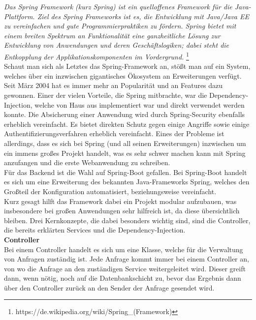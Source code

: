 \emph{\glqq   
Das Spring Framework (kurz Spring) ist ein quelloffenes Framework für die Java-Plattform. Ziel des Spring Frameworks ist es, die Entwicklung mit Java/Java EE zu vereinfachen und gute Programmierpraktiken zu fördern. Spring bietet mit einem breiten Spektrum an Funktionalität eine ganzheitliche Lösung zur Entwicklung von Anwendungen und deren Geschäftslogiken; dabei steht die Entkopplung der Applikationskomponenten im Vordergrund.
\grqq} \footnote{https://de.wikipedia.org/wiki/Spring\_(Framework)} \\

Schaut man sich als Letztes das Spring-Framework an, stößt man auf ein System, welches über ein inzwischen gigantisches Ökosystem an Erweiterungen verfügt. Seit März 2004 hat es immer mehr an Popularität und an Features dazu gewonnen. Einer der vielen Vorteile, die Spring mitbrachte, war die Dependency-Injection, welche von Haus aus implementiert war und direkt verwendet werden konnte. Die Absicherung einer Anwendung wird durch Spring-Security ebenfalls erheblich vereinfacht. Es bietet direkten Schutz gegen einige Angriffe sowie einige Authentifizierungsverfahren erheblich vereinfacht.  Eines der Probleme ist allerdings, dass es sich bei Spring (und all seinen Erweiterungen) inzwischen um ein immens großes Projekt handelt, was es sehr schwer machen kann mit Spring anzufangen und die erste Webanwendung zu schreiben. \\

Für das Backend ist die Wahl auf Spring-Boot gefallen. Bei Spring-Boot handelt es sich um eine Erweiterung des bekannten Java-Frameworks Spring, welches den Großteil der Konfiguration automatisiert, beziehungsweise vereinfacht.\\
Kurz gesagt hilft das Framework dabei ein Projekt modular aufzubauen, was insbesondere bei großen Anwendungen sehr hilfreich ist, da diese übersichtlich bleiben. Drei Kernkonzepte, die dabei besonders wichtig sind, sind die Controller, die bereits erklärten Services und die Dependency-Injection. \\

\textbf{Controller}\\
Bei einem Controller handelt es sich um eine Klasse, welche für die Verwaltung von Anfragen zuständig ist. Jede Anfrage kommt immer bei einem Controller an, von wo die Anfrage an den zuständigen Service weitergeleitet wird. Dieser greift dann, wenn nötig, noch auf die Datenbankschicht zu, bevor das Ergebnis dann über den Controller zurück an den Sender der Anfrage gesendet wird.\\

